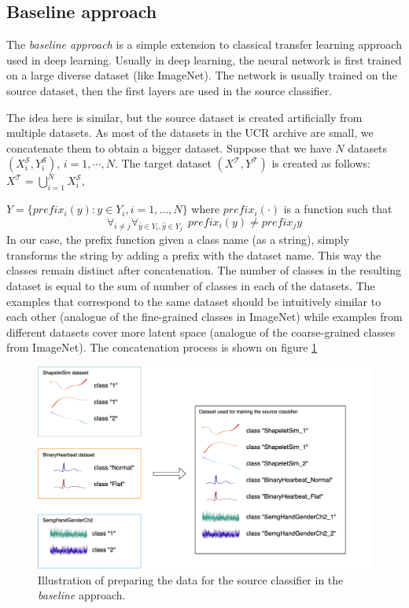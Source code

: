 \documentclass[a4paper,11pt,twoside]{report}
\theoremstyle{definition}
\begin{document}
\subsection{Baseline approach}
The \textit{baseline approach} is a simple extension to classical transfer learning approach used in deep learning. Usually in deep learning, the neural network is first trained on a large diverse dataset (like ImageNet). The network is usually trained on the source dataset, then the first layers are used in the source classifier.

The idea here is similar, but the source dataset is created artificially from multiple datasets. As most of the datasets in the UCR archive are small, we concatenate them to obtain a bigger dataset. Suppose that we have $N$ datasets $(X_i^\mathcal{S}, Y_i^\mathcal{S})$, $i=1, \cdots, N$.
The target dataset $(X^\mathcal{T}, Y^\mathcal{T})$ is created as follows:
$X^\mathcal{T} = \bigcup_{i=1}^N X_i^\mathcal{S}$,

$Y = \{prefix_i(y): y \in Y_i, i=1, \dots, N\}$
where $prefix_i(\cdot)$ is a function such that $$\forall_{i\neq j} \forall_{\bar{y} \in Y_i, \hat{y} \in Y_j} \ \  prefix_i(y) \neq prefix_j{y}$$
In our case, the prefix function given a class name (as a string), simply transforms the string by adding a prefix with the dataset name. This way the classes remain distinct after concatenation. The number of classes in the resulting dataset is equal to the sum of number of classes in each of the datasets. The examples that correspond to the same dataset should be intuitively similar to each other (analogue of the fine-grained classes in ImageNet) while examples from different datasets cover more latent space (analogue of the coarse-grained classes from ImageNet). The concatenation process is shown on figure \ref{fig:baseline_dataset}


\FloatBarrier
\begin{figure}[h!]
\centering
\includegraphics[width=17cm]{imgs/baseline.drawio.png}
\caption{Illustration of preparing the data for the source classifier in the\textit{ baseline} approach.}
\label{fig:baseline_dataset}
\end{figure}
\end{document}
